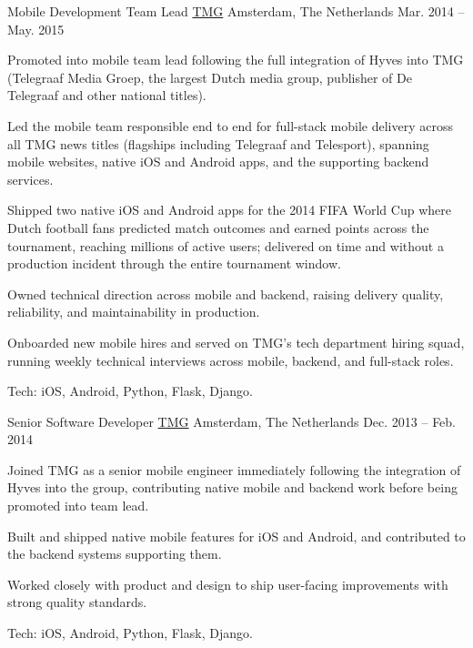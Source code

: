 \begin{cventries}
  \cventry
    {Mobile Development Team Lead} %
    {\href{https://www.tmg.nl/nl}{TMG}} %
    {Amsterdam, The Netherlands} %
    {Mar. 2014 -- May. 2015} %
    {
      \begin{cvitems} %
        \item {Promoted into mobile team lead following the full integration of Hyves into TMG (Telegraaf Media Groep, the largest Dutch media group, publisher of De Telegraaf and other national titles).}
        \item {Led the mobile team responsible end to end for full-stack mobile delivery across all TMG news titles (flagships including Telegraaf and Telesport), spanning mobile websites, native iOS and Android apps, and the supporting backend services.}
        \item {Shipped two native iOS and Android apps for the 2014 FIFA World Cup where Dutch football fans predicted match outcomes and earned points across the tournament, reaching millions of active users; delivered on time and without a production incident through the entire tournament window.}
        \item {Owned technical direction across mobile and backend, raising delivery quality, reliability, and maintainability in production.}
        \item {Onboarded new mobile hires and served on TMG's tech department hiring squad, running weekly technical interviews across mobile, backend, and full-stack roles.}
        \item {Tech: iOS, Android, Python, Flask, Django.}
      \end{cvitems}
    }

  \cventry
    {Senior Software Developer} %
    {\href{https://www.tmg.nl/nl}{TMG}} %
    {Amsterdam, The Netherlands} %
    {Dec. 2013 -- Feb. 2014} %
    {
      \begin{cvitems} %
        \item {Joined TMG as a senior mobile engineer immediately following the integration of Hyves into the group, contributing native mobile and backend work before being promoted into team lead.}
        \item {Built and shipped native mobile features for iOS and Android, and contributed to the backend systems supporting them.}
        \item {Worked closely with product and design to ship user-facing improvements with strong quality standards.}
        \item {Tech: iOS, Android, Python, Flask, Django.}
      \end{cvitems}
    }


\end{cventries}
